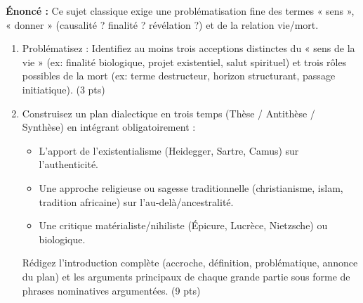 \documentclass[11pt]{article}
\begin{document}
\begin{exercice}
\textbf{Énoncé :} Ce sujet classique exige une problématisation fine des termes « sens », « donner » (causalité ? finalité ? révélation ?) et de la relation vie/mort.
\begin{enumerate}
    \item Problématisez : Identifiez au moins trois acceptions distinctes du « sens de la vie » (ex: finalité biologique, projet existentiel, salut spirituel) et trois rôles possibles de la mort (ex: terme destructeur, horizon structurant, passage initiatique). (3 pts)
    \item Construisez un plan dialectique en trois temps (Thèse / Antithèse / Synthèse) en intégrant obligatoirement : 
    \begin{itemize}
        \item L'apport de l'existentialisme (Heidegger, Sartre, Camus) sur l'authenticité.
        \item Une approche religieuse ou sagesse traditionnelle (christianisme, islam, tradition africaine) sur l'au-delà/ancestralité.
        \item Une critique matérialiste/nihiliste (Épicure, Lucrèce, Nietzsche) ou biologique.
    \end{itemize}
    Rédigez l'introduction complète (accroche, définition, problématique, annonce du plan) et les arguments principaux de chaque grande partie sous forme de phrases nominatives argumentées. (9 pts)
\end{enumerate}
\end{exercice}
\end{document}
